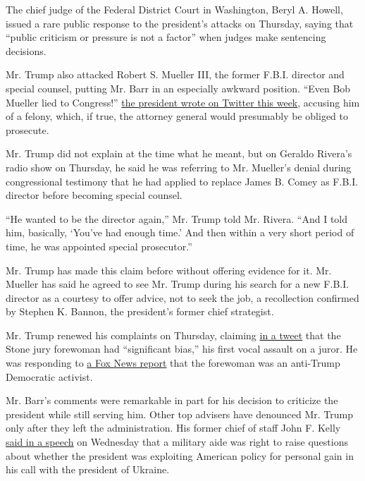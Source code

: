 The chief judge of the Federal District Court in Washington, Beryl A.
Howell, issued a rare public response to the president's attacks on
Thursday, saying that ``public criticism or pressure is not a factor''
when judges make sentencing decisions.

Mr. Trump also attacked Robert S. Mueller III, the former F.B.I.
director and special counsel, putting Mr. Barr in an especially awkward
position. ``Even Bob Mueller lied to Congress!''
\href{https://twitter.com/realDonaldTrump/status/1227561237782855680?s=20}{the
president wrote on Twitter this week}, accusing him of a felony, which,
if true, the attorney general would presumably be obliged to prosecute.

Mr. Trump did not explain at the time what he meant, but on Geraldo
Rivera's radio show on Thursday, he said he was referring to Mr.
Mueller's denial during congressional testimony that he had applied to
replace James B. Comey as F.B.I. director before becoming special
counsel.

``He wanted to be the director again,'' Mr. Trump told Mr. Rivera. ``And
I told him, basically, `You've had enough time.' And then within a very
short period of time, he was appointed special prosecutor.''

Mr. Trump has made this claim before without offering evidence for it.
Mr. Mueller has said he agreed to see Mr. Trump during his search for a
new F.B.I. director as a courtesy to offer advice, not to seek the job,
a recollection confirmed by Stephen K. Bannon, the president's former
chief strategist.

Mr. Trump renewed his complaints on Thursday, claiming
\href{https://twitter.com/realDonaldTrump/status/1227939838751657984}{in
a tweet} that the Stone jury forewoman had ``significant bias,'' his
first vocal assault on a juror. He was responding to
\href{https://www.foxnews.com/politics/roger-stone-juror-justice-department-anti-trump-social-media}{a
Fox News report} that the forewoman was an anti-Trump Democratic
activist.

Mr. Barr's comments were remarkable in part for his decision to
criticize the president while still serving him. Other top advisers have
denounced Mr. Trump only after they left the administration. His former
chief of staff John F. Kelly
\href{https://www.nytimes3xbfgragh.onion/2020/02/13/us/politics/trump-roger-stone.html}{said
in a speech} on Wednesday that a military aide was right to raise
questions about whether the president was exploiting American policy for
personal gain in his call with the president of Ukraine.

